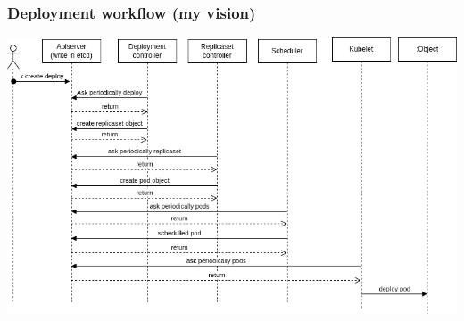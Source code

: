 \subsubsection{Deployment workflow (my vision)}
\begin{frame}[fragile]{\subsubsecname}
  \includegraphics[width=1\linewidth]{assets/k8s-deploy-creation-drawio.png}
\end{frame}
